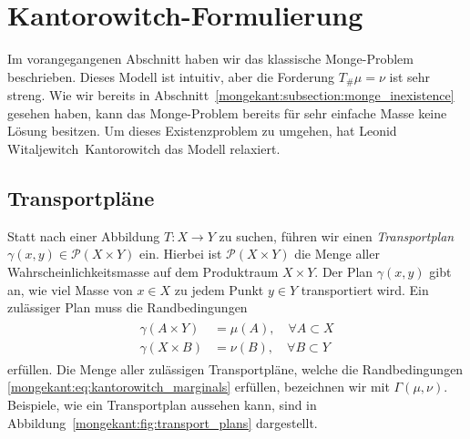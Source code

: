 %
%
%
%
\section{Kantorowitch-Formulierung%
\label{mongekant:section:teil2}}

Im vorangegangenen Abschnitt haben wir das klassische Monge-Problem beschrieben.
Dieses Modell ist intuitiv,
aber die Forderung $T_{\#}\mu=\nu$ ist sehr streng.
Wie wir bereits in Abschnitt~\ref{mongekant:subsection:monge_inexistence} gesehen haben,
kann das Monge-Problem bereits für sehr einfache Masse keine Lösung besitzen.
Um dieses Existenzproblem zu umgehen,
hat Leonid Witaljewitch~Kantorowitch das Modell relaxiert.

\subsection{Transportpläne}
Statt nach einer Abbildung $T\colon X\to Y$ zu suchen,
führen wir einen \emph{Transportplan} $\gamma(x,y) \in \mathcal{P}(X \times Y)$ ein.
%
Hierbei ist $\mathcal{P}(X \times Y)$ die Menge aller Wahrscheinlichkeitsmasse
auf dem Produktraum $X \times Y$.
Der Plan $\gamma(x,y)$ gibt an,
wie viel Masse von $x \in X$ zu jedem Punkt $y \in Y$ transportiert wird.
Ein zulässiger Plan muss die Randbedingungen
\begin{align}
\begin{aligned}
\gamma(A \times Y)
&=
\mu(A)
,\quad \forall A \subset X
\\
\gamma(X \times B)
&=
\nu(B)
,\quad \forall B \subset Y
\end{aligned}
\label{mongekant:eq:kantorowitch_marginals}
\end{align}
erfüllen.
Die Menge aller zulässigen Transportpläne,
welche die Randbedingungen \eqref{mongekant:eq:kantorowitch_marginals} erfüllen,
bezeichnen wir mit $\Gamma(\mu, \nu)$.
Beispiele,
wie ein Transportplan aussehen kann,
sind in Abbildung~\ref{mongekant:fig:transport_plans} dargestellt.

